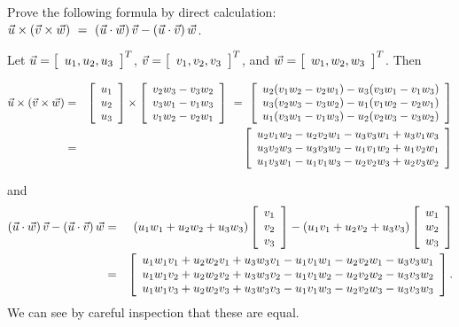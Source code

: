 \documentclass{ximera}
\begin{document}
  
  \begin{example}\label{ex:triple-cross-product}
    Prove the following formula by direct calculation:
    $\vect{u}\times(\vect{v}\times\vect{w}) ~=~
    (\vect{u}\cdot\vect{w})\,\vect{v} -
    (\vect{u}\cdot\vect{v})\,\vect{w}$.


    \begin{solution}
      Let $\vect{u}=\startmat{c}u_1,u_2,u_3\stopmat^T$,
      $\vect{v}=\startmat{c}v_1,v_2,v_3\stopmat^T$, and
      $\vect{w}=\startmat{c}w_1,w_2,w_3\stopmat^T$.
      Then

      \begin{eqnarray*}
        \vect{u}\times(\vect{v}\times\vect{w})
        &=&
        \startmat{c}u_1\\u_2\\u_3\stopmat
        \times
        \startmat{c}
          v_2w_3 - v_3w_2 \\
          v_3w_1 - v_1w_3 \\
          v_1w_2 - v_2w_1 \\
        \stopmat
        ~=~
        \startmat{c}
          u_2(v_1w_2 - v_2w_1) - u_3(v_3w_1 - v_1w_3) \\
          u_3(v_2w_3 - v_3w_2) - u_1(v_1w_2 - v_2w_1) \\
          u_1(v_3w_1 - v_1w_3) - u_2(v_2w_3 - v_3w_2) \\
        \stopmat \\
        &=&
        \startmat{c}
          u_2v_1w_2 - u_2v_2w_1 - u_3v_3w_1 + u_3v_1w_3 \\
          u_3v_2w_3 - u_3v_3w_2 - u_1v_1w_2 + u_1v_2w_1 \\
          u_1v_3w_1 - u_1v_1w_3 - u_2v_2w_3 + u_2v_3w_2 \\
        \stopmat
      \end{eqnarray*}

      and
      \begin{eqnarray*}
        (\vect{u}\cdot\vect{w})\,\vect{v} -
        (\vect{u}\cdot\vect{v})\,\vect{w}
        &=& (u_1w_1+u_2w_2+u_3w_3)
            \startmat{c} v_1\\v_2\\v_3 \stopmat
        - (u_1v_1+u_2v_2+u_3v_3)
        \startmat{c} w_1\\w_2\\w_3 \stopmat
        \\
        &=& \startmat{c}
          u_1w_1v_1+u_2w_2v_1+u_3w_3v_1 - u_1v_1w_1-u_2v_2w_1-u_3v_3w_1 \\
          u_1w_1v_2+u_2w_2v_2+u_3w_3v_2 - u_1v_1w_2-u_2v_2w_2-u_3v_3w_2 \\
          u_1w_1v_3+u_2w_2v_3+u_3w_3v_3 - u_1v_1w_3-u_2v_2w_3-u_3v_3w_3 \\
        \stopmat.
      \end{eqnarray*}
      We can see by careful inspection that these are equal.

    \end{solution}
\end{example}
\end{document}
